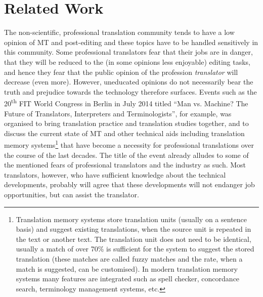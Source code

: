\documentclass[output=paper]{langsci/langscibook}
\begin{document}
\section{Related Work}

The non-scientific, professional translation community tends to have a low opinion of MT and post-editing and these topics have to be handled sensitively in this community. Some professional translators fear that their jobs are in danger, that they will be reduced to the (in some opinions less enjoyable) editing tasks, and hence they fear that the public opinion of the profession \textit{translator} will decrease (even more). However, uneducated opinions do not necessarily bear the truth and prejudice towards the technology therefore surfaces. Events such as the 20\textsuperscript{th} FIT World Congress in Berlin in July 2014 titled “Man vs. Machine? The Future of Translators, Interpreters and Terminologists”, for example, was organised to bring translation practice and translation studies together, and to discuss the current state of MT and other technical aids including translation memory systems\footnote{Translation memory systems store translation units (usually on a sentence basis) and suggest existing translations, when the source unit is repeated in the text or another text. The translation unit does not need to be identical, usually a match of over 70\% is sufficient for the system to suggest the stored translation (these matches are called fuzzy matches and the rate, when a match is suggested, can be customised). In modern translation memory systems many features are integrated such as spell checker, concordance search, terminology management systems, etc.} that have become a necessity for professional translations over the course of the last decades. The title of the event already alludes to some of the mentioned fears of professional translators and the industry as such. Most translators, however, who have sufficient knowledge about the technical developments, probably will agree that these developments will not endanger job opportunities, but can assist the translator.
\end{document}
